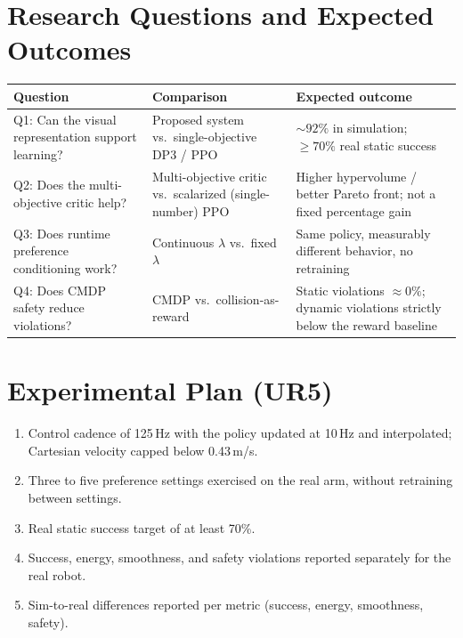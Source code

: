 \documentclass[11pt,a4paper]{article}
\begin{document}
\section{Research Questions and Expected Outcomes}

\renewcommand{\arraystretch}{1.3}
\begin{tabularx}{\linewidth}{@{}>{\raggedright\arraybackslash}X
>{\raggedright\arraybackslash}X >{\raggedright\arraybackslash}X@{}}
\toprule
\textbf{Question} & \textbf{Comparison} & \textbf{Expected outcome} \\
\midrule
Q1: Can the visual representation support learning?
& Proposed system vs.\ single-objective DP3 / PPO &
$\sim 92\%$ in simulation; $\geq 70\%$ real static success \\
Q2: Does the multi-objective critic help?
& Multi-objective critic vs.\ scalarized (single-number) PPO &
Higher hypervolume / better Pareto front; not a fixed percentage gain \\
Q3: Does runtime preference conditioning work?
& Continuous $\lambda$ vs.\ fixed $\lambda$ &
Same policy, measurably different behavior, no retraining \\
Q4: Does CMDP safety reduce violations?
& CMDP vs.\ collision-as-reward &
Static violations $\approx 0\%$; dynamic violations strictly below the
reward baseline \\
\bottomrule
\end{tabularx}

\section{Experimental Plan (UR5)}

\begin{enumerate}
  \item Control cadence of 125\,Hz with the policy updated at 10\,Hz and
  interpolated; Cartesian velocity capped below 0.43\,m/s.
  \item Three to five preference settings exercised on the real arm,
  without retraining between settings.
  \item Real static success target of at least 70\%.
  \item Success, energy, smoothness, and safety violations reported
  separately for the real robot.
  \item Sim-to-real differences reported per metric (success, energy,
  smoothness, safety).
\end{enumerate}
\end{document}
